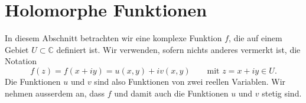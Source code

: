 %
%
%
\section{Holomorphe Funktionen
\label{buch:holomorph:section:holomorph}}
In diesem Abschnitt betrachten wir eine komplexe Funktion $f$, die auf
einem Gebiet $U\subset\mathbb{C}$ definiert ist.
Wir verwenden, sofern nichts anderes vermerkt ist, die Notation
\[
f(z) = f(x+iy) = u(x,y) + iv(x,y)
\qquad
\text{mit $z=x+iy\in U$.}
\]
Die Funktionen $u$ und $v$ sind also Funktionen von zwei reellen Variablen.
Wir nehmen ausserdem an, dass $f$ und damit auch die Funktionen $u$ und $v$
stetig sind.





